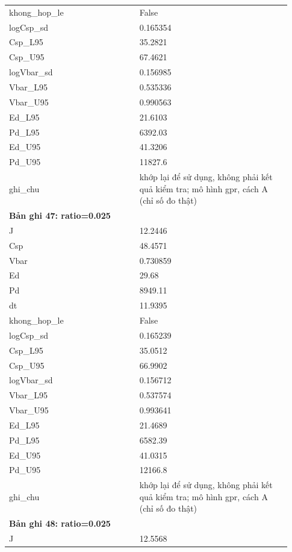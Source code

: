 \begin{longtable}{p{0.43\linewidth}p{0.50\linewidth}}
khong\_\allowbreak hop\_\allowbreak le & False \\
logCsp\_\allowbreak sd & 0.165354 \\
Csp\_\allowbreak L95 & 35.2821 \\
Csp\_\allowbreak U95 & 67.4621 \\
logVbar\_\allowbreak sd & 0.156985 \\
Vbar\_\allowbreak L95 & 0.535336 \\
Vbar\_\allowbreak U95 & 0.990563 \\
Ed\_\allowbreak L95 & 21.6103 \\
Pd\_\allowbreak L95 & 6392.03 \\
Ed\_\allowbreak U95 & 41.3206 \\
Pd\_\allowbreak U95 & 11827.6 \\
ghi\_\allowbreak chu & khớp lại để sử dụng, không phải kết quả kiểm tra; mô hình gpr, cách A (chỉ số đo thật) \\
\midrule
\multicolumn{2}{p{0.95\linewidth}}{\textbf{Bản ghi 47: ratio=0.025}} \\
J & 12.2446 \\
Csp & 48.4571 \\
Vbar & 0.730859 \\
Ed & 29.68 \\
Pd & 8949.11 \\
dt & 11.9395 \\
khong\_\allowbreak hop\_\allowbreak le & False \\
logCsp\_\allowbreak sd & 0.165239 \\
Csp\_\allowbreak L95 & 35.0512 \\
Csp\_\allowbreak U95 & 66.9902 \\
logVbar\_\allowbreak sd & 0.156712 \\
Vbar\_\allowbreak L95 & 0.537574 \\
Vbar\_\allowbreak U95 & 0.993641 \\
Ed\_\allowbreak L95 & 21.4689 \\
Pd\_\allowbreak L95 & 6582.39 \\
Ed\_\allowbreak U95 & 41.0315 \\
Pd\_\allowbreak U95 & 12166.8 \\
ghi\_\allowbreak chu & khớp lại để sử dụng, không phải kết quả kiểm tra; mô hình gpr, cách A (chỉ số đo thật) \\
\midrule
\multicolumn{2}{p{0.95\linewidth}}{\textbf{Bản ghi 48: ratio=0.025}} \\
J & 12.5568 \\

\end{longtable}
